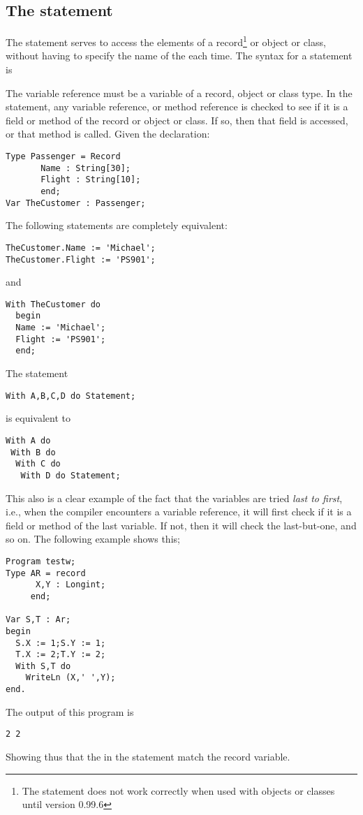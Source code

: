 \documentclass{report}
\begin{document}
\subsection{The  statement}
\label{se:With}
The  statement serves to access the elements of a record\footnote{
The  statement does not work correctly when used with
objects or classes until version 0.99.6}
or object or class, without having to specify the name of the each time.
The syntax for a  statement is

The variable reference must be a variable of a record, object or class type.
In the  statement, any variable reference, or method reference is
checked to see if it is a field or method of the record or object or class.
If so, then that field is accessed, or that method is called.
Given the declaration:
\begin{verbatim}
Type Passenger = Record
       Name : String[30];
       Flight : String[10];
       end;
Var TheCustomer : Passenger;
\end{verbatim}
The following statements are completely equivalent:
\begin{verbatim}
TheCustomer.Name := 'Michael';
TheCustomer.Flight := 'PS901';
\end{verbatim}
and
\begin{verbatim}
With TheCustomer do
  begin
  Name := 'Michael';
  Flight := 'PS901';
  end;
\end{verbatim}
The statement
\begin{verbatim}
With A,B,C,D do Statement;
\end{verbatim}
is equivalent to
\begin{verbatim}
With A do
 With B do
  With C do
   With D do Statement;
\end{verbatim}
This also is a clear example of the fact that the variables are tried {\em last
to first}, i.e., when the compiler encounters a variable reference, it will
first check if it is a field or method of the last variable. If not, then it
will check the last-but-one, and so on.
The following example shows this;
\begin{verbatim}
Program testw;
Type AR = record
      X,Y : Longint;
     end;

Var S,T : Ar;
begin
  S.X := 1;S.Y := 1;
  T.X := 2;T.Y := 2;
  With S,T do
    WriteLn (X,' ',Y);
end.
\end{verbatim}
The output of this program is
\begin{verbatim}
2 2
\end{verbatim}
Showing thus that the  in the  statement match the
 record variable.
\end{document}
